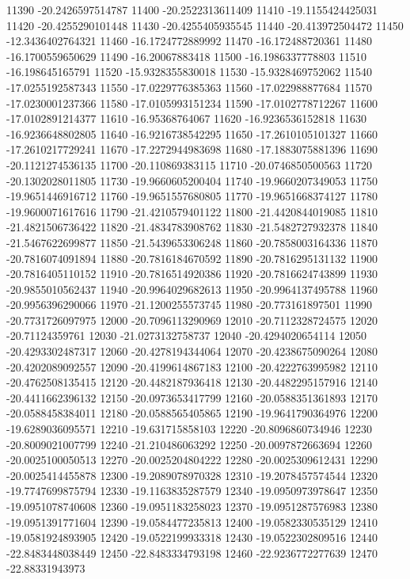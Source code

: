 {11390 -20.2426597514787
11400 -20.2522313611409
11410 -19.1155424425031
11420 -20.4255290101448
11430 -20.4255405935545
11440 -20.413972504472
11450 -12.3436402764321
11460 -16.1724772889992
11470 -16.172488720361
11480 -16.1700559650629
11490 -16.20067883418
11500 -16.1986337778803
11510 -16.198645165791
11520 -15.9328355830018
11530 -15.9328469752062
11540 -17.0255192587343
11550 -17.0229776385363
11560 -17.022988877684
11570 -17.0230001237366
11580 -17.0105993151234
11590 -17.0102778712267
11600 -17.0102891214377
11610 -16.95368764067
11620 -16.9236536152818
11630 -16.9236648802805
11640 -16.9216738542295
11650 -17.2610105101327
11660 -17.2610217729241
11670 -17.2272944983698
11680 -17.1883075881396
11690 -20.1121274536135
11700 -20.110869383115
11710 -20.0746850500563
11720 -20.1302028011805
11730 -19.9660605200404
11740 -19.9660207349053
11750 -19.9651446916712
11760 -19.9651557680805
11770 -19.9651668374127
11780 -19.9600071617616
11790 -21.4210579401122
11800 -21.4420844019085
11810 -21.4821506736422
11820 -21.4834783908762
11830 -21.5482727932378
11840 -21.5467622699877
11850 -21.5439653306248
11860 -20.7858003164336
11870 -20.7816074091894
11880 -20.7816184670592
11890 -20.7816295131132
11900 -20.7816405110152
11910 -20.7816514920386
11920 -20.7816624743899
11930 -20.9855010562437
11940 -20.9964029682613
11950 -20.9964137495788
11960 -20.9956396290066
11970 -21.1200255573745
11980 -20.773161897501
11990 -20.7731726097975
12000 -20.7096113290969
12010 -20.7112328724575
12020 -20.71124359761
12030 -21.0273132758737
12040 -20.4294020654114
12050 -20.4293302487317
12060 -20.4278194344064
12070 -20.4238675090264
12080 -20.4202089092557
12090 -20.4199614867183
12100 -20.4222763995982
12110 -20.4762508135415
12120 -20.4482187936418
12130 -20.4482295157916
12140 -20.4411662396132
12150 -20.0973653417799
12160 -20.0588351361893
12170 -20.0588458384011
12180 -20.0588565405865
12190 -19.9641790364976
12200 -19.6289036095571
12210 -19.631715858103
12220 -20.8096860734946
12230 -20.8009021007799
12240 -21.210486063292
12250 -20.0097872663694
12260 -20.0025100050513
12270 -20.0025204804222
12280 -20.0025309612431
12290 -20.0025414455878
12300 -19.2089078970328
12310 -19.2078457574544
12320 -19.7747699875794
12330 -19.1163835287579
12340 -19.0950973978647
12350 -19.0951078740608
12360 -19.0951183258023
12370 -19.0951287576983
12380 -19.0951391771604
12390 -19.0584477235813
12400 -19.0582330535129
12410 -19.0581924893905
12420 -19.0522199933318
12430 -19.0522302809516
12440 -22.8483448038449
12450 -22.8483334793198
12460 -22.9236772277639
12470 -22.88331943973
}
